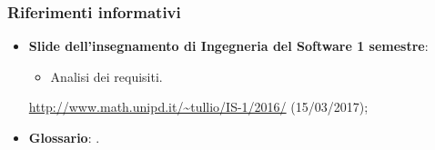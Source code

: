 \documentclass[../AnalisiDeiRequisiti.tex]{subfiles}
\begin{document}
			\subsubsection{Riferimenti informativi}	
				\begin{itemize}
					\item \textbf{Slide dell'insegnamento di Ingegneria del Software
					1 semestre}:
						\begin{itemize}
							\item Analisi dei requisiti.
						\end{itemize}
						\url{http://www.math.unipd.it/~tullio/IS-1/2016/} (15/03/2017);
					\item \textbf{Glossario}: \glossariov.
				\end{itemize}
\end{document}
